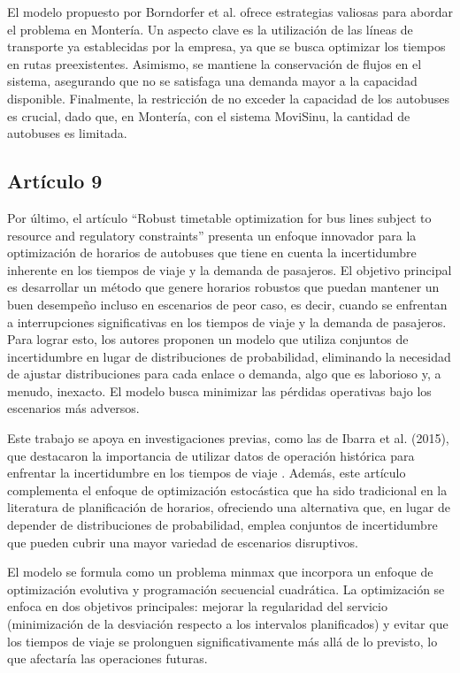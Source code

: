 \documentclass[preprint,11pt]{elsarticle}
\begin{document}
El modelo propuesto por Borndorfer et al. \cite{borndorfer2005} ofrece estrategias valiosas para abordar el problema en Montería. Un aspecto clave es la utilización de las líneas de transporte ya establecidas por la empresa, ya que se busca optimizar los tiempos en rutas preexistentes. Asimismo, se mantiene la conservación de flujos en el sistema, asegurando que no se satisfaga una demanda mayor a la capacidad disponible. Finalmente, la restricción de no exceder la capacidad de los autobuses es crucial, dado que, en Montería, con el sistema MoviSinu, la cantidad de autobuses es limitada.

\subsection*{Artículo 9}

Por último, el artículo “Robust timetable optimization for bus lines subject to resource and regulatory constraints” \cite{gkiotsalitis2019} presenta un enfoque innovador para la optimización de horarios de autobuses que tiene en cuenta la incertidumbre inherente en los tiempos de viaje y la demanda de pasajeros. El objetivo principal es desarrollar un método que genere horarios robustos que puedan mantener un buen desempeño incluso en escenarios de peor caso, es decir, cuando se enfrentan a interrupciones significativas en los tiempos de viaje y la demanda de pasajeros. Para lograr esto, los autores proponen un modelo que utiliza conjuntos de incertidumbre en lugar de distribuciones de probabilidad, eliminando la necesidad de ajustar distribuciones para cada enlace o demanda, algo que es laborioso y, a menudo, inexacto. El modelo busca minimizar las pérdidas operativas bajo los escenarios más adversos.

Este trabajo se apoya en investigaciones previas, como las de Ibarra et al. (2015), que destacaron la importancia de utilizar datos de operación histórica para enfrentar la incertidumbre en los tiempos de viaje \cite{ibarra2015}. Además, este artículo complementa el enfoque de optimización estocástica que ha sido tradicional en la literatura de planificación de horarios, ofreciendo una alternativa que, en lugar de depender de distribuciones de probabilidad, emplea conjuntos de incertidumbre que pueden cubrir una mayor variedad de escenarios disruptivos.

El modelo se formula como un problema minmax que incorpora un enfoque de optimización evolutiva y programación secuencial cuadrática. La optimización se enfoca en dos objetivos principales: mejorar la regularidad del servicio (minimización de la desviación respecto a los intervalos planificados) y evitar que los tiempos de viaje se prolonguen significativamente más allá de lo previsto, lo que afectaría las operaciones futuras.
\end{document}
